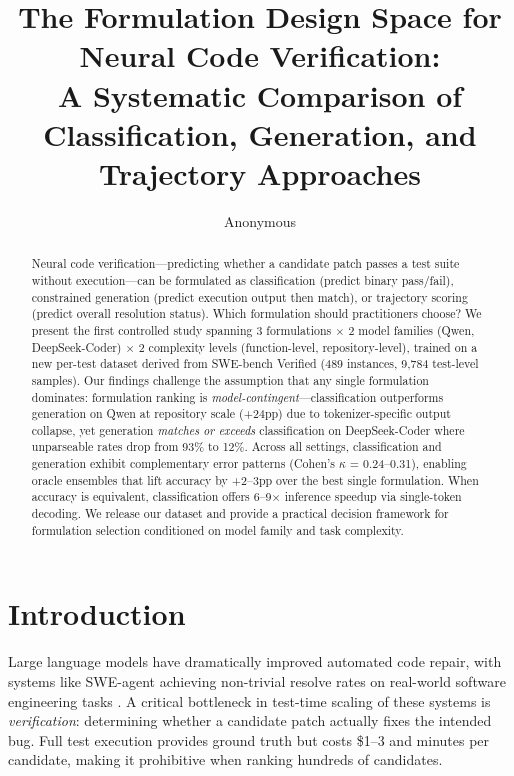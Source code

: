 \documentclass[11pt,a4paper]{article}
\title{The Formulation Design Space for Neural Code Verification:\\A Systematic Comparison of Classification, Generation, and Trajectory Approaches}
\author{Anonymous}
\begin{document}
\maketitle

\begin{abstract}
Neural code verification---predicting whether a candidate patch passes a test suite without execution---can be formulated as classification (predict binary pass/fail), constrained generation (predict execution output then match), or trajectory scoring (predict overall resolution status). Which formulation should practitioners choose? We present the first controlled study spanning 3 formulations $\times$ 2 model families (Qwen, DeepSeek-Coder) $\times$ 2 complexity levels (function-level, repository-level), trained on a new per-test dataset derived from SWE-bench Verified (489 instances, 9,784 test-level samples). Our findings challenge the assumption that any single formulation dominates: formulation ranking is \emph{model-contingent}---classification outperforms generation on Qwen at repository scale (+24pp) due to tokenizer-specific output collapse, yet generation \emph{matches or exceeds} classification on DeepSeek-Coder where unparseable rates drop from 93\% to 12\%. Across all settings, classification and generation exhibit complementary error patterns (Cohen's $\kappa$ = 0.24--0.31), enabling oracle ensembles that lift accuracy by +2--3pp over the best single formulation. When accuracy is equivalent, classification offers 6--9$\times$ inference speedup via single-token decoding. We release our dataset and provide a practical decision framework for formulation selection conditioned on model family and task complexity.
\end{abstract}

\section{Introduction}

Large language models have dramatically improved automated code repair, with systems like SWE-agent achieving non-trivial resolve rates on real-world software engineering tasks \cite{jimenez2024swebench}. A critical bottleneck in test-time scaling of these systems is \emph{verification}: determining whether a candidate patch actually fixes the intended bug. Full test execution provides ground truth but costs \$1--3 and minutes per candidate, making it prohibitive when ranking hundreds of candidates.
\end{document}
